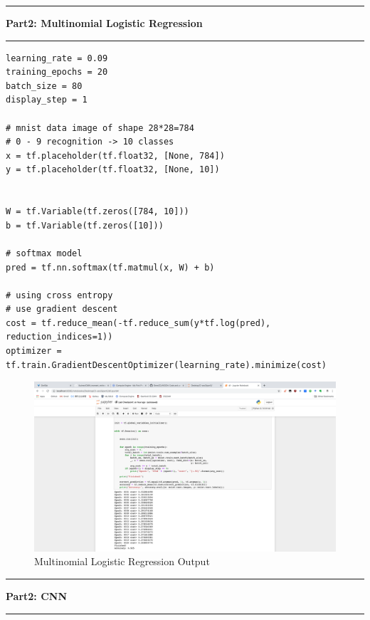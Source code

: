 \documentclass[11pt]{article}
\newcommand\question[2]{\vspace{.25in}\hrule\textbf{#1: #2}\vspace{.5em}\hrule\vspace{.10in}}
\begin{document}
\question{Part2}{Multinomial Logistic Regression}
\begin{lstlisting}
learning_rate = 0.09
training_epochs = 20
batch_size = 80
display_step = 1

# mnist data image of shape 28*28=784
# 0 - 9 recognition -> 10 classes
x = tf.placeholder(tf.float32, [None, 784]) 
y = tf.placeholder(tf.float32, [None, 10])


W = tf.Variable(tf.zeros([784, 10]))
b = tf.Variable(tf.zeros([10]))

# softmax model
pred = tf.nn.softmax(tf.matmul(x, W) + b) 

# using cross entropy
# use gradient descent
cost = tf.reduce_mean(-tf.reduce_sum(y*tf.log(pred), reduction_indices=1))
optimizer = tf.train.GradientDescentOptimizer(learning_rate).minimize(cost)
\end{lstlisting}


\begin{figure}[H]
    \centering
    \includegraphics[width=1\textwidth]{Fig6}
    \caption{Multinomial Logistic Regression Output}
\end{figure}

\question{Part2}{CNN}
\end{document}
